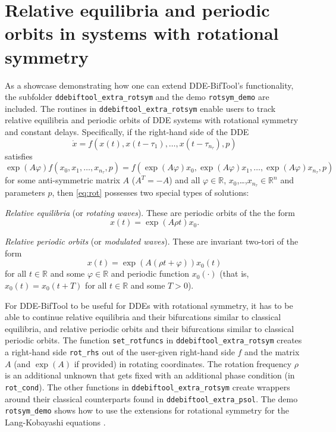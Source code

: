 \documentclass[11pt]{scrartcl}
\renewcommand{\phi}{\varphi}
\newcommand{\R}{\mathbb{R}}
\newcommand{\blist}[1]{\mbox{\lstinline!#1!}}  \newlength{\tabw}
\begin{document}
\section{Relative equilibria and periodic orbits in systems with
  rotational symmetry}
\label{sec:rot}

As a showcase demonstrating how one can extend DDE-BifTool's
functionality, the subfolder \texttt{ddebiftool\_extra\_rotsym} and
the demo \texttt{rotsym\_demo} are included. The routines in
\texttt{ddebiftool\_extra\_rotsym} enable users to track relative
equilibria and periodic orbits of DDE systems with rotational symmetry
and constant delays. Specifically, if the right-hand side of the DDE
\begin{equation}\label{eq:rot}
  \dot x=f(x(t),x(t-\tau_1),\ldots,x(t-\tau_{n_\tau}),p)
\end{equation}
satisfies
\begin{displaymath}
  \exp(A\phi)f(x_0,x_1,\ldots,x_{n_\tau},p)=
  f(\exp(A\phi)x_0,\exp(A\phi)x_1,\ldots,
  \exp(A\phi)x_{n_\tau},p)
\end{displaymath}
for some anti-symmetric matrix $A$ ($A^T=-A$) and all $\phi\in\R$,
$x_0$,\ldots,$x_{n_\tau}\in\R^n$ and parameters $p$, then
\eqref{eq:rot} possesses two special types of solutions:
\begin{compactitem}
\item \emph{Relative equilibria} (or \emph{rotating waves}). These are
  periodic orbits of the the form
  \begin{equation}
    x(t)=\exp(A\rho t)x_0\mbox{.}\label{eq:rw}
\end{equation}
\item \emph{Relative periodic orbits} (or \emph{modulated
    waves}). These are invariant two-tori of the form
  \begin{equation}
    x(t)=\exp(A(\rho t+\phi))x_0(t)\label{eq:mw}
  \end{equation}
  for all $t\in\R$ and some $\phi\in\R$ and periodic function
  $x_0(\cdot)$ (that is, $x_0(t)=x_0(t+T)$ for all $t\in\R$ and some $T>0$).
\end{compactitem}
For DDE-BifTool to be useful for DDEs with rotational symmetry, it
has to be able to continue relative equilibria and their bifurcations
similar to classical equilibria, and relative periodic orbits and their
bifurcations similar to classical periodic orbits. The function
\blist{set_rotfuncs} in \texttt{ddebiftool\_extra\_rotsym} creates a
right-hand side \blist{rot_rhs} out of the user-given right-hand side
$f$ and the matrix $A$ (and $\exp(A)$ if provided) in rotating
coordinates. The rotation frequency $\rho$ is an additional unknown
that gets fixed with an additional phase condition (in
\blist{rot_cond}). The other functions in
\texttt{ddebiftool\_extra\_rotsym} create wrappers around their
classical counterparts found in \texttt{ddebiftool\_extra\_psol}. The
demo \texttt{rotsym\_demo} shows how to use the extensions for
rotational symmetry for the Lang-Kobayashi equations \cite{LK80}.



{\small 
}
\end{document}
